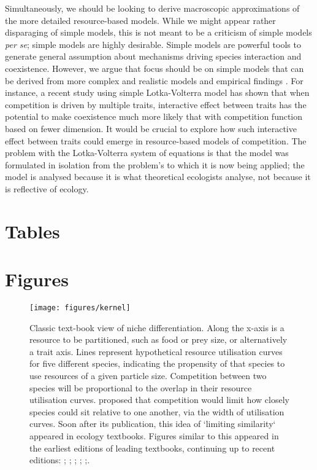 \documentclass[a4paper,11pt]{article}
\begin{document}
Simultaneously, we should be looking to derive macroscopic approximations of the more detailed resource-based models.
While we might appear rather disparaging of simple models, this is not meant to be a criticism of simple models \textit{per se}; simple models are highly desirable.
Simple models are powerful tools to generate general assumption about mechanisms driving species interaction and coexistence. However, we argue that focus should be on simple models that can be derived from more complex and realistic models and empirical findings \citep[e.g.][]{Champagnat-2006}. For instance, a recent study \citep{Doebeli-2010} using simple Lotka-Volterra model has shown that when competition is driven by multiple traits, interactive effect between traits has the potential to make coexistence much more likely that with competition function based on fewer dimension. It would be crucial to explore how such interactive effect between traits could emerge in resource-based models of competition.
The problem with the Lotka-Volterra system of equations is that the model was formulated in isolation from the problem's to which it is now being applied; the model is analysed because it is what theoretical ecologists analyse, not because it is reflective of ecology.


\clearpage

\section{Tables}



\clearpage

\section{Figures}

\begin{figure}[h]
  \centering
  \texttt{[image: figures/kernel]}
  \caption{Classic text-book view of niche differentiation.
Along the
    x-axis is a resource to be partitioned, such as food or prey size,
    or alternatively a trait axis.  Lines represent hypothetical
    resource utilisation curves for five different species, indicating
    the propensity of that species to use resources of a given particle size.
    Competition between two species will be proportional to
    the overlap in their resource utilisation
    curves. \citet{MacArthur-1967} proposed that competition would
    limit how closely species could sit relative to one another, via
    the width of utilisation curves. Soon after its publication,
    this idea of `limiting similarity` appeared in ecology textbooks.
    Figures similar to this appeared in the earliest
    editions of leading textbooks, continuing up to recent editions:
    \citet[Fig. 7.9]{Begon-1986}; \citet[Fig. 8.29]{Begon-2006};
    \citet[Fig. 12.20]{Krebs-1978}; \citet[????]{ Krebs-2013};
    \citet[Fig. 36.13]{Ricklefs-1973};\citet[Fig. 29.19]{Ricklefs-1999}.}
  \label{fig:competition-functions}
\end{figure}
\end{document}
